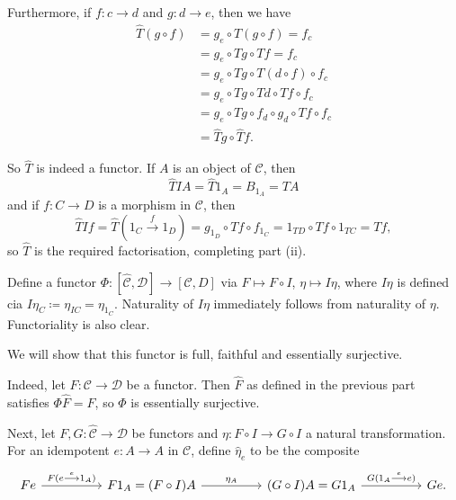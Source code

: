 Furthermore, if $f\colon c\to d$ and $g\colon d\to e$, then we have
\begin{align*}
	\widehat{T}(g \circ f) &= g_e \circ T(g \circ f) = f_c\\
	&= g_e \circ Tg \circ Tf = f_c\\
	&= g_e \circ Tg \circ T(d \circ f) \circ f_c\\
	&= g_e \circ Tg \circ Td \circ Tf \circ f_c\\
	&= g_e \circ Tg \circ f_d \circ g_d \circ Tf \circ f_c\\
	&= \widehat{T}g \circ \widehat{T}f.
\end{align*}

So $\widehat{T}$ is indeed a functor. If $A$ is an object of $\mathcal{C}$, then
\[ \widehat{T}IA = \widehat{T}1_A = B_{1_A} = TA \]
and if $f\colon C\to D$ is a morphism in $\mathcal{C}$, then
\[ \widehat{T}If = \widehat{T}(1_C\stackrel{f}{\longrightarrow}1_D) = g_{1_D} \circ Tf \circ f_{1_C} = 1_{TD} \circ Tf \circ 1_{TC} = Tf, \]
so $\widehat{T}$ is the required factorisation, completing part (ii).

Define a functor $\Phi\colon [\widehat{\mathcal{C}}, \mathcal{D}]\to [\mathcal{C}, D]$ via
$F\mapsto F \circ I$, $\eta\mapsto I\eta$, where $I\eta$ is defined cia
$I\eta_C \coloneqq \eta_{IC} = \eta_{1_C}$. Naturality of $I\eta$ immediately follows
from naturality of $\eta$. Functoriality is also clear.

We will show that this functor is full, faithful and essentially surjective.

Indeed, let $F\colon \mathcal{C}\to \mathcal{D}$ be a functor. Then $\widehat{F}$ as
defined in the previous part satisfies $\Phi\widehat{F} = F$, so $\Phi$ is essentially
surjective.

Next, let $F, G\colon \widehat{\mathcal{C}}\to \mathcal{D}$ be functors and $\eta\colon F\circ I\to G \circ I$ a
natural transformation. For an idempotent $e\colon A\to A$ in $\mathcal{C}$, define $\hat{\eta}_e$ to be the composite
\[\begin{tikzcd}[column sep=huge]
	Fe \ar[r, "F(e\stackrel{e}{\longrightarrow}1_A)"] & F1_A = (F\circ I)A \ar[r, "\eta_A"] & (G \circ I)A = G1_A \ar[r, "G(1_A\stackrel{e}{\longrightarrow}e)"] & Ge.
\end{tikzcd}\]

